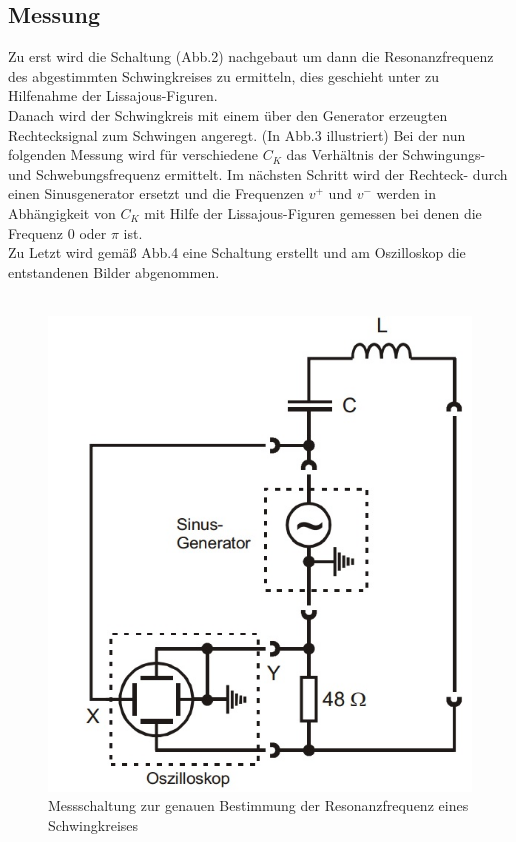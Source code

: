 \subsection{Messung}
Zu erst wird die Schaltung (Abb.2) nachgebaut um dann die Resonanzfrequenz des abgestimmten Schwingkreises zu ermitteln, dies geschieht unter zu Hilfenahme der Lissajous-Figuren. \\
Danach wird der Schwingkreis mit einem über den Generator erzeugten Rechtecksignal zum Schwingen angeregt. (In Abb.3 illustriert)
Bei der nun folgenden Messung wird für verschiedene $C_K$ das Verhältnis der Schwingungs- und Schwebungsfrequenz ermittelt.
Im nächsten Schritt wird der Rechteck- durch einen Sinusgenerator ersetzt und die Frequenzen $v^+$ und $v^-$ werden in Abhängigkeit von $C_K$ mit Hilfe der Lissajous-Figuren gemessen bei denen die Frequenz 0 oder $\pi$ ist. \\
Zu Letzt wird gemäß Abb.4 eine Schaltung erstellt und am Oszilloskop die entstandenen Bilder abgenommen. \\
\\
\begin{figure}[h]
        \centering
        \includegraphics[scale=0.5]{Grafiken/V355Abb2.jpg}
        \caption{Messschaltung zur genauen Bestimmung der Resonanzfrequenz eines Schwingkreises}
        \label{fig:Abb2}
\end{figure}
